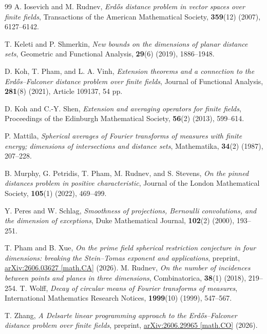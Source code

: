 \documentclass[11pt]{article}
\begin{document}
\begin{thebibliography}{99}
A. Iosevich and M. Rudnev,
\emph{Erd\H{o}s distance problem in vector spaces over finite fields},
Transactions of the American Mathematical Society, \textbf{359}(12)
(2007), 6127--6142.

T. Keleti and P. Shmerkin,
\emph{New bounds on the dimensions of planar distance sets},
Geometric and Functional Analysis, \textbf{29}(6) (2019), 1886--1948.

D. Koh, T. Pham, and L. A. Vinh,
\emph{Extension theorems and a connection to the Erd\H{o}s--Falconer
distance problem over finite fields},
Journal of Functional Analysis, \textbf{281}(8) (2021),
Article 109137, 54 pp.

D. Koh and C.-Y. Shen,
\emph{Extension and averaging operators for finite fields},
Proceedings of the Edinburgh Mathematical Society, \textbf{56}(2) (2013),
599--614.

P. Mattila,
\emph{Spherical averages of Fourier transforms of measures with finite
energy; dimensions of intersections and distance sets},
Mathematika, \textbf{34}(2) (1987), 207--228.

B. Murphy, G. Petridis, T. Pham, M. Rudnev, and S. Stevens,
\emph{On the pinned distances problem in positive characteristic},
Journal of the London Mathematical Society, \textbf{105}(1) (2022),
469--499.



Y. Peres and W. Schlag,
\emph{Smoothness of projections, Bernoulli convolutions, and the dimension
of exceptions},
Duke Mathematical Journal, \textbf{102}(2) (2000), 193--251.

T. Pham and B. Xue,
\emph{On the prime field spherical restriction conjecture in four
dimensions: breaking the Stein--Tomas exponent and applications},
preprint, \href{https://arxiv.org/abs/2606.03627}
{arXiv:2606.03627 [math.CA]} (2026).
M. Rudnev, \textit{On the number of incidences between points and planes in three dimensions}, Combinatorica, \textbf{38}(1) (2018), 219--254.
T. Wolff,
\emph{Decay of circular means of Fourier transforms of measures},
International Mathematics Research Notices, \textbf{1999}(10) (1999),
547--567.

T. Zhang,
\emph{A Delsarte linear programming approach to the Erd\H{o}s--Falconer
distance problem over finite fields},
preprint, \href{https://arxiv.org/abs/2606.29965}
{arXiv:2606.29965 [math.CO]} (2026).
\end{thebibliography}
\end{document}
